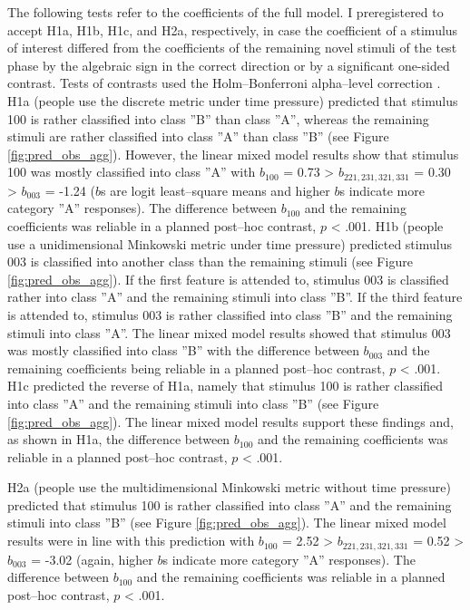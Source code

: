 \documentclass[a4paper,man,natbib]{apa6}
\begin{document}
The following tests refer to the coefficients of the full model. I preregistered to accept H1a, H1b, H1c, and H2a, respectively, in case the coefficient of a stimulus of interest differed from the coefficients of the remaining novel stimuli of the test phase by the algebraic sign in the correct direction or by a significant one-sided contrast. Tests of contrasts used the Holm--Bonferroni alpha--level correction \citep{holm1979simple}. H1a (people use the discrete metric under time pressure) predicted that stimulus 100 is rather classified into class ''B'' than class ''A'', whereas the remaining stimuli are rather classified into class ''A'' than class ''B'' (see Figure \ref{fig:pred_obs_agg}). However, the linear mixed model results show that stimulus 100 was mostly classified into class ''A'' with $b_{100}$ = 0.73 > $ b_{221,231,321,331}$ = 0.30 > $b_{003}$ = -1.24 ($b$s are logit least--square means and higher $b$s indicate more category ''A'' responses). The difference between $b_{100}$ and the remaining coefficients was reliable in a planned post--hoc contrast, $p$ < .001. H1b (people use a unidimensional Minkowski metric under time pressure) predicted stimulus 003 is classified into another class than the remaining stimuli (see Figure \ref{fig:pred_obs_agg}). If the first feature is attended to, stimulus 003 is classified rather into class ''A'' and the remaining stimuli into class ''B''. If the third feature is attended to, stimulus 003 is rather classified into class ''B'' and the remaining stimuli into class ''A''. The linear mixed model results showed that stimulus 003 was mostly classified into class ''B'' with the difference between $b_{003}$ and the remaining coefficients being reliable in a planned post--hoc contrast, $p$ < .001. H1c predicted the reverse of H1a, namely that stimulus 100 is rather classified into class ''A'' and the remaining stimuli into class ''B'' (see Figure \ref{fig:pred_obs_agg}). The linear mixed model results support these findings and, as shown in H1a, the difference between $b_{100}$ and the remaining coefficients was reliable in a planned post--hoc contrast, $p$ < .001. 

H2a (people use the multidimensional Minkowski metric without time pressure) predicted that stimulus 100 is rather classified into class ''A'' and the remaining stimuli into class ''B'' (see Figure \ref{fig:pred_obs_agg}). The linear mixed model results were in line with this prediction with $b_{100}$ = 2.52 > $ b_{221,231,321,331}$ = 0.52 > $b_{003}$ = -3.02 (again, higher $b$s indicate more category ''A'' responses). The difference between $b_{100}$ and the remaining coefficients was reliable in a planned post--hoc contrast, $p$ < .001. 
\end{document}
